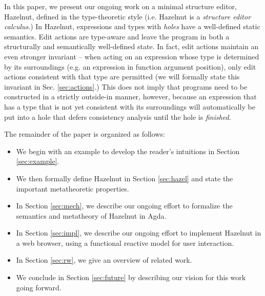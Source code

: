 In this paper, we present our ongoing work on a minimal structure editor, Hazelnut,  defined in the type-theoretic style (i.e. Hazelnut is a \emph{structure editor calculus}.) In Hazelnut, expressions and types with \emph{holes} have a well-defined static semantics. Edit actions are type-aware and leave the program in both a structurally and semantically well-defined state. In fact, edit actions maintain an even stronger invariant -- when acting on an expression whose type is determined by its surroundings (e.g. an expression in function argument position), only edit actions consistent with that type are permitted (we will formally state this invariant in Sec. \ref{sec:actions}.) This does not imply that programs need to be constructed in a strictly outside-in manner, however, because an expression that has a type that is not yet consistent with its surroundings will automatically be put into a {hole} that defers consistency analysis until the hole is \emph{finished}.

The remainder of the paper is organized as follows:
\begin{itemize}
  \item We begin with an example to develop the reader's intuitions in Section
    \ref{sec:example}.

  \item We then formally define Hazelnut in Section \ref{sec:hazel} and state the important metatheoretic properties.

  \item In Section \ref{sec:mech}, we describe our ongoing effort to formalize the semantics and metatheory of Hazelnut in Agda.

  \item In Section \ref{sec:impl}, we describe our ongoing effort to implement Hazelnut in a web browser, using a functional reactive model for user interaction.
  \item In Section \ref{sec:rw}, we give an overview of related work.
  \item We conclude in Section \ref{sec:future} by describing our vision for this work going 
    forward.
\end{itemize}
